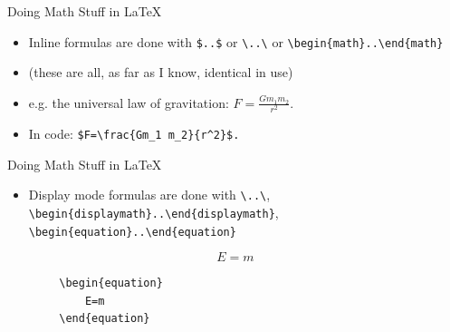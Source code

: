 \documentclass{beamer}
\begin{document}
\begin{frame}
\end{frame}	

\begin{frame}[fragile]{Doing Math Stuff in \LaTeX}
	\begin{itemize}
		\item Inline formulas are done with \verb|$..$| or \verb|\..\| or \verb|\begin{math}..\end{math}|
		\pause
		\item (these are all, as far as I know, identical in use)
		\pause
		\item e.g. the universal law of gravitation: $F=\frac{Gm_1 m_2}{r^2}$.
		\pause
		\item In code: \verb|$F=\frac{Gm_1 m_2}{r^2}$.|
	\end{itemize}
\end{frame}

\begin{frame}[fragile]{Doing Math Stuff in \LaTeX}
	\begin{itemize}
		\item Display mode formulas are done with \verb|\..\|, \verb|\begin{displaymath}..\end{displaymath}|, \verb|\begin{equation}..\end{equation}|
\end{itemize}
\end{frame}
	
\begin{frame}[fragile]
	\begin{equation}
		E=m
	\end{equation}
	\pause
	\begin{Verbatim}
		\begin{equation}
			E=m
		\end{equation}
	\end{Verbatim}
\end{frame}
\end{document}
